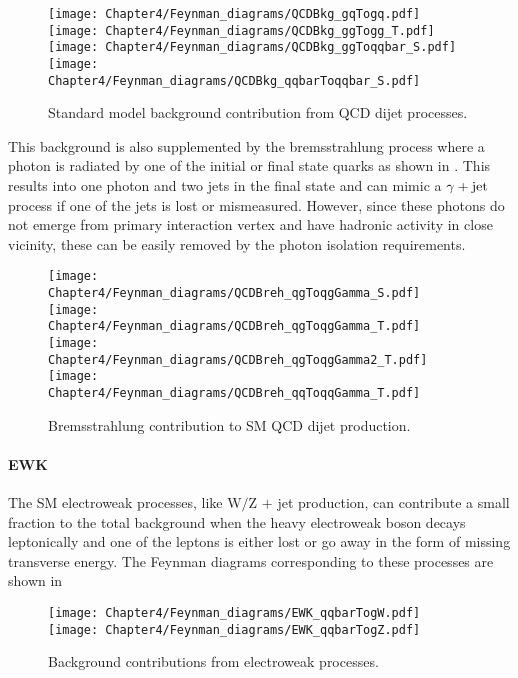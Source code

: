 \begin{figure}[h!]
\centering
 \texttt{[image: Chapter4/Feynman\_diagrams/QCDBkg\_gqTogq.pdf]}
 \texttt{[image: Chapter4/Feynman\_diagrams/QCDBkg\_ggTogg\_T.pdf]}\\
 \texttt{[image: Chapter4/Feynman\_diagrams/QCDBkg\_ggToqqbar\_S.pdf]}
 \texttt{[image: Chapter4/Feynman\_diagrams/QCDBkg\_qqbarToqqbar\_S.pdf]} 
 \caption{Standard model background contribution from  QCD dijet processes.}
\label{fig:QCDDijet_bkg}
\end{figure}
\vspace{-0.1in}

This background is also supplemented by the bremsstrahlung process where a photon is radiated by one of the initial or final state quarks
as shown in \fig{\ref{fig:QCDBreh_bkg}}. This results into one photon and two jets in the final state and can mimic a $\gamma+\mathrm{jet}$ process if one of the jets is
lost or mismeasured. However, since these photons do not emerge from primary interaction vertex and have hadronic activity
in close vicinity, these can be easily removed by the photon isolation requirements.

\begin{figure}[h!]
\centering
  \texttt{[image: Chapter4/Feynman\_diagrams/QCDBreh\_qgToqgGamma\_S.pdf]}
  \texttt{[image: Chapter4/Feynman\_diagrams/QCDBreh\_qgToqgGamma\_T.pdf]}\\
  \texttt{[image: Chapter4/Feynman\_diagrams/QCDBreh\_qgToqgGamma2\_T.pdf]}
  \texttt{[image: Chapter4/Feynman\_diagrams/QCDBreh\_qqToqqGamma\_T.pdf]}
 \caption{Bremsstrahlung contribution to SM QCD dijet production.}
\label{fig:QCDBreh_bkg}
\end{figure}
\paragraph {\bf{EWK}}
\hspace{\parindent} The SM electroweak processes, like W$/$Z $+$ jet production,
can contribute a small fraction to the total background when the heavy electroweak
boson decays leptonically and one of the leptons is either lost or go away in the form of missing transverse energy.
The Feynman diagrams corresponding to these processes are shown in
\fig{\ref{fig:EWK_bkg}}

\begin{figure}[h!]
\centering
 \texttt{[image: Chapter4/Feynman\_diagrams/EWK\_qqbarTogW.pdf]}
 \texttt{[image: Chapter4/Feynman\_diagrams/EWK\_qqbarTogZ.pdf]}
 \caption{Background contributions from electroweak processes.}
\label{fig:EWK_bkg}
\end{figure}
\vspace{-0.3in}
